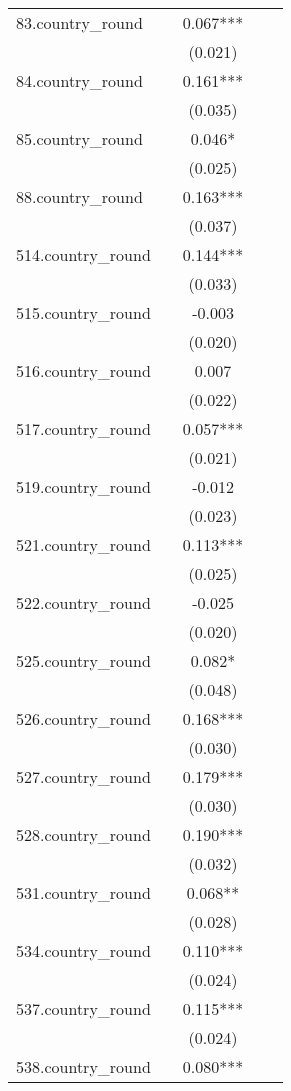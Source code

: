 \documentclass[]{article}
\begin{document}
\begin{tabular}{lcccc}
83.country\_round &  & 0.067*** &  &  \\
 &  & (0.021) &  &  \\
84.country\_round &  & 0.161*** &  &  \\
 &  & (0.035) &  &  \\
85.country\_round &  & 0.046* &  &  \\
 &  & (0.025) &  &  \\
88.country\_round &  & 0.163*** &  &  \\
 &  & (0.037) &  &  \\
514.country\_round &  & 0.144*** &  &  \\
 &  & (0.033) &  &  \\
515.country\_round &  & -0.003 &  &  \\
 &  & (0.020) &  &  \\
516.country\_round &  & 0.007 &  &  \\
 &  & (0.022) &  &  \\
517.country\_round &  & 0.057*** &  &  \\
 &  & (0.021) &  &  \\
519.country\_round &  & -0.012 &  &  \\
 &  & (0.023) &  &  \\
521.country\_round &  & 0.113*** &  &  \\
 &  & (0.025) &  &  \\
522.country\_round &  & -0.025 &  &  \\
 &  & (0.020) &  &  \\
525.country\_round &  & 0.082* &  &  \\
 &  & (0.048) &  &  \\
526.country\_round &  & 0.168*** &  &  \\
 &  & (0.030) &  &  \\
527.country\_round &  & 0.179*** &  &  \\
 &  & (0.030) &  &  \\
528.country\_round &  & 0.190*** &  &  \\
 &  & (0.032) &  &  \\
531.country\_round &  & 0.068** &  &  \\
 &  & (0.028) &  &  \\
534.country\_round &  & 0.110*** &  &  \\
 &  & (0.024) &  &  \\
537.country\_round &  & 0.115*** &  &  \\
 &  & (0.024) &  &  \\
538.country\_round &  & 0.080*** &  &  \\

\end{tabular}
\end{document}
